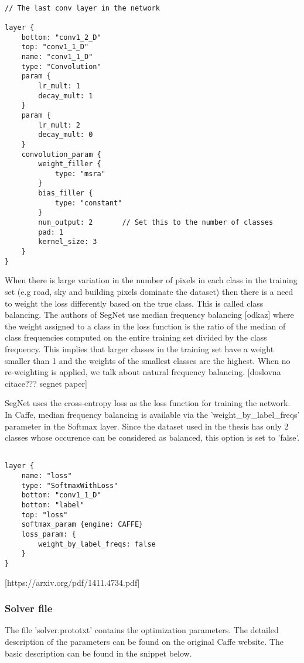 \begin{lstlisting}

// The last conv layer in the network

layer {
	bottom: "conv1_2_D"
	top: "conv1_1_D"
	name: "conv1_1_D"
	type: "Convolution"
	param {
		lr_mult: 1
		decay_mult: 1
	}
	param {
		lr_mult: 2
		decay_mult: 0
	}
	convolution_param {
		weight_filler {
			type: "msra"
		}
		bias_filler {
			type: "constant"
		}
		num_output: 2		// Set this to the number of classes
		pad: 1
		kernel_size: 3
	}
}

\end{lstlisting}

When there is large variation in the number of
pixels in each class in the training set (e.g road, sky and building
pixels dominate the dataset) then there is a need to weight
the loss differently based on the true class. This is called class
balancing. The authors of SegNet use median frequency balancing [odkaz] where the weight assigned to a class in the loss function is the ratio of the
median of class frequencies computed on the entire training set
divided by the class frequency. This implies that larger classes in
the training set have a weight smaller than 1 and the weights
of the smallest classes are the highest. When no re-weighting is applied, we talk about natural frequency balancing. [doslovna citace??? segnet paper]

SegNet uses the cross-entropy loss as the loss function for
training the network. In Caffe, median frequency balancing is available via the 'weight\_by\_label\_freqs' parameter in the Softmax layer. Since the dataset used in the thesis has only 2 classes whose occurence can be considered as balanced, this option is set to 'false'. 

\begin{lstlisting}

layer {
	name: "loss"
	type: "SoftmaxWithLoss"
	bottom: "conv1_1_D"
	bottom: "label"
	top: "loss"
	softmax_param {engine: CAFFE}
	loss_param: {
		weight_by_label_freqs: false	     
	}
}

\end{lstlisting}

 [https://arxiv.org/pdf/1411.4734.pdf]

\subsubsection{Solver file}

The file 'solver.prototxt' contains the optimization parameters. The detailed description of the parameters can be found on the original Caffe website. The basic description can be found in the snippet below. 

